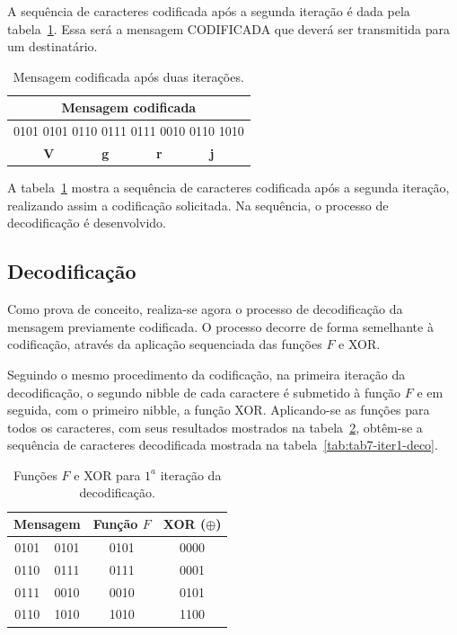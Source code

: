 \documentclass[a4paper,pra,aps,twocolumn,superscriptaddress,10pt,final]{revtex4-2}
\begin{document}
    A sequência de caracteres codificada após a segunda iteração é dada pela tabela~\ref{tab:tab5-mens}. Essa será a mensagem CODIFICADA que deverá ser transmitida para um destinatário.

    \begin{table}[!htpb]
        \caption{Mensagem codificada após duas iterações.}
        \label{tab:tab5-mens}
        \begin{tabular}{|c|}
        \hline
        \textbf{Mensagem codificada}  \\ \hline
        0101 0101 0110 0111 0111 0010 0110 1010     \\ \hline
        \textbf{V $\qquad\quad$ g $\qquad \quad$ r $\qquad \quad$ j} \\ \hline
        \end{tabular}%
    \end{table}

    A tabela~\ref{tab:tab5-mens} mostra a sequência de caracteres codificada após a segunda iteração, realizando assim a codificação solicitada. Na sequência, o processo de decodificação é desenvolvido.

    \subsection{Decodificação}
    \label{sec:decoding}

    Como prova de conceito, realiza-se agora o processo de decodificação da mensagem previamente codificada. O processo decorre de forma semelhante à codificação, através da aplicação sequenciada das funções $F$ e XOR.
    
    Seguindo o mesmo procedimento da codificação, na primeira iteração da decodificação, o segundo nibble de cada caractere é submetido à função $F$ e em seguida, com o primeiro nibble, a função XOR. Aplicando-se as funções para todos os caracteres, com seus resultados mostrados na tabela~\ref{tab:tab6-funcao}, obtêm-se a sequência de caracteres decodificada mostrada na tabela~\ref{tab:tab7-iter1-deco}.

    \begin{table}[!htpb]
        \caption{Funções $F$ e XOR para $1^a$ iteração da decodificação.}
        \label{tab:tab6-funcao}
        \begin{tabular}{|cc|c|c|}
            \hline
            \multicolumn{2}{|c|}{\textbf{Mensagem}} & \textbf{Função $F$} & \textbf{XOR ($\oplus$)} \\ \hline
            \multicolumn{1}{|c|}{0101}    & 0101    & 0101                & 0000                                 \\ \hline
            \multicolumn{1}{|c|}{0110}    & 0111    & 0111                & 0001                                 \\ \hline
            \multicolumn{1}{|c|}{0111}    & 0010    & 0010                & 0101                                 \\ \hline
            \multicolumn{1}{|c|}{0110}    & 1010    & 1010                & 1100                                 \\ \hline
        \end{tabular}
    \end{table}
    
\end{document}
